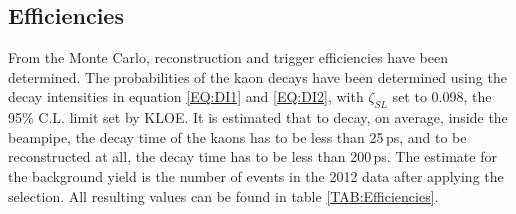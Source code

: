 \subsection{Efficiencies}
From the Monte Carlo, reconstruction and trigger efficiencies have been determined. The probabilities of the kaon decays have been determined using the decay intensities in equation \eqref{EQ:DI1} and \eqref{EQ:DI2}, with 
$\zeta_{SL}$ set to 0.098, the 95\% C.L. limit set by KLOE. It is estimated that to decay, on 
average, inside the beampipe, the decay time of the kaons has to be less than 25\,ps, and to be reconstructed at all, the decay time has to be less than 200\,ps. The estimate for the background yield is the number of events in the 2012 data after applying the selection. All resulting values can be found in table \ref{TAB:Efficiencies}.


